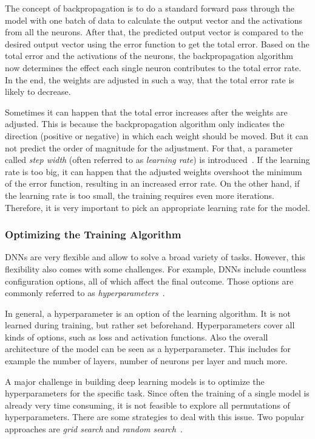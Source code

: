 The concept of backpropagation is to do a standard forward pass through the model with one batch of data to calculate the output vector and the activations from all the neurons. After that, the predicted output vector is compared to the desired output vector using the error function to get the total error. Based on the total error and the activations of the neurons, the backpropagation algorithm now determines the effect each single neuron contributes to the total error rate. In the end, the weights are adjusted in such a way, that the total error rate is likely to decrease.

Sometimes it can happen that the total error increases after the weights are adjusted. This is because the backpropagation algorithm only indicates the direction (positive or negative) in which each weight should be moved. But it can not predict the order of magnitude for the adjustment. For that, a parameter called \emph{step width} (often referred to as \emph{learning rate}) is introduced~\cite[p.~169]{nn_intro96}. If the learning rate is too big, it can happen that the adjusted weights overshoot the minimum of the error function, resulting in an increased error rate. On the other hand, if the learning rate is too small, the training requires even more iterations. Therefore, it is very important to pick an appropriate learning rate for the model.

\subsubsection{Optimizing the Training Algorithm}
DNNs are very flexible and allow to solve a broad variety of tasks. However, this flexibility also comes with some challenges. For example, DNNs include countless configuration options, all of which affect the final outcome. Those options are commonly referred to as \emph{hyperparameters}~\cite[pp.~270ff]{praxiseinstieg_ml17}. 

In general, a hyperparameter is an option of the learning algorithm. It is not learned during training, but rather set beforehand. Hyperparameters cover all kinds of options, such as loss and activation functions. Also the overall architecture of the model can be seen as a hyperparameter. This includes for example the number of layers, number of neurons per layer and much more.

A major challenge in building deep learning models is to optimize the hyperparameters for the specific task. Since often the training of a single model is already very time consuming, it is not feasible to explore all permutations of hyperparameters. There are some strategies to deal with this issue. Two popular approaches are \emph{grid search} and \emph{random search}~\cite[pp.~73ff]{praxiseinstieg_ml17}.

